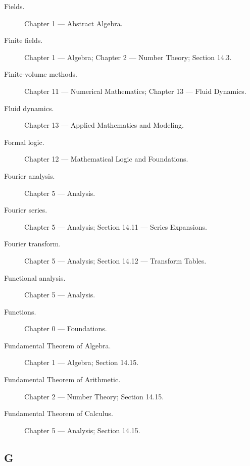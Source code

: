 \begin{description}

\item[Fields.]
Chapter 1 --- Abstract Algebra.

\item[Finite fields.]
Chapter 1 --- Algebra;
Chapter 2 --- Number Theory;
Section 14.3.

\item[Finite-volume methods.]
Chapter 11 --- Numerical Mathematics;
Chapter 13 --- Fluid Dynamics.

\item[Fluid dynamics.]
Chapter 13 --- Applied Mathematics and Modeling.

\item[Formal logic.]
Chapter 12 --- Mathematical Logic and Foundations.

\item[Fourier analysis.]
Chapter 5 --- Analysis.

\item[Fourier series.]
Chapter 5 --- Analysis;
Section 14.11 --- Series Expansions.

\item[Fourier transform.]
Chapter 5 --- Analysis;
Section 14.12 --- Transform Tables.

\item[Functional analysis.]
Chapter 5 --- Analysis.

\item[Functions.]
Chapter 0 --- Foundations.

\item[Fundamental Theorem of Algebra.]
Chapter 1 --- Algebra;
Section 14.15.

\item[Fundamental Theorem of Arithmetic.]
Chapter 2 --- Number Theory;
Section 14.15.

\item[Fundamental Theorem of Calculus.]
Chapter 5 --- Analysis;
Section 14.15.

\end{description}

\subsection*{G}

